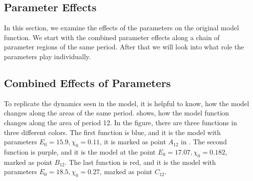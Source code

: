 \subsection{Parameter Effects}
\label{sec:setup.char.paramfx}

In this section, we examine the effects of the parameters on the original model function.
We start with the combined parameter effects along a chain of parameter regions of the same period.
After that we will look into what role the parameters play individually.

\subsection{Combined Effects of Parameters}
\label{sec:setup.char.paramfx.combined}

To replicate the dynamics seen in the model, it is helpful to know, how the model changes along the areas of the same period.
 shows, how the model function changes along the area of period 12.
In the figure, there are three functions in three different colors.
The first function is blue, and it is the model with parameters $E_0 = 15.9, \chi_0 = 0.11$, it is marked as point $A_12$ in .
The second function is purple, and it is the model at the point $E_0 = 17.07, \chi_0 = 0.182$, marked as point $B_{12}$.
The last function is red, and it is the model with parameters $E_0 = 18.5, \chi_0 = 0.27$, marked as point $C_{12}$.

